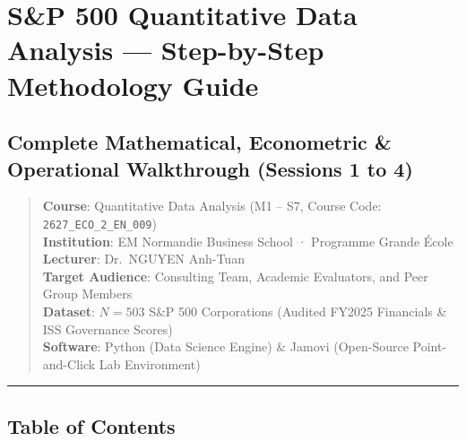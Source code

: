 \documentclass[
]{article}
\author{}
\date{}
\begin{document}
\section{S\&P 500 Quantitative Data Analysis --- Step-by-Step
Methodology
Guide}\label{sp-500-quantitative-data-analysis-step-by-step-methodology-guide}

\subsection{Complete Mathematical, Econometric \& Operational
Walkthrough (Sessions 1 to
4)}\label{complete-mathematical-econometric-operational-walkthrough-sessions-1-to-4}

\begin{quote}
\textbf{Course}: Quantitative Data Analysis (M1 -- S7, Course Code:
\texttt{2627\_ECO\_2\_EN\_009})\\
\textbf{Institution}: EM Normandie Business School · Programme Grande
École\\
\textbf{Lecturer}: Dr.~NGUYEN Anh-Tuan\\
\textbf{Target Audience}: Consulting Team, Academic Evaluators, and Peer
Group Members\\
\textbf{Dataset}: \(N = 503\) S\&P 500 Corporations (Audited FY2025
Financials \& ISS Governance Scores)\\
\textbf{Software}: Python (Data Science Engine) \& Jamovi (Open-Source
Point-and-Click Lab Environment)
\end{quote}

\begin{center}\rule{0.5\linewidth}{0.5pt}\end{center}

\subsection{Table of Contents}\label{table-of-contents}
\end{document}
